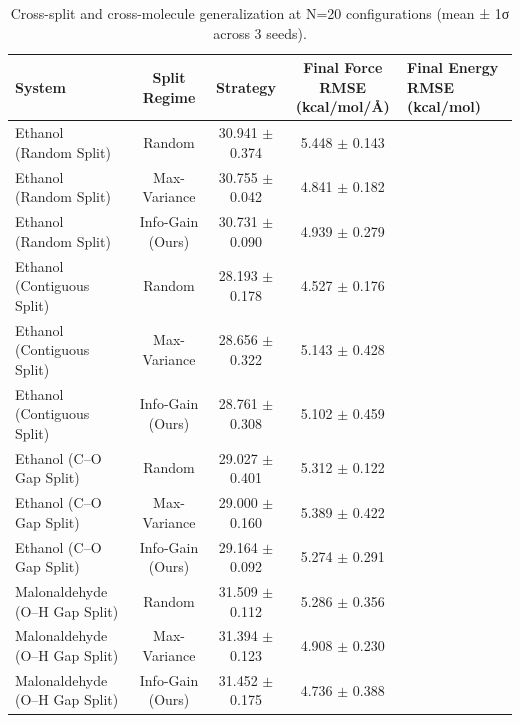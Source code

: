 \begin{table}[htbp]
\centering
\caption{Cross-split and cross-molecule generalization at N=20 configurations (mean ± 1σ across 3 seeds).}
\label{tab:multi_split_robustness}
\begin{tabular}{lccc}
\toprule
System & Split Regime & Strategy & Final Force RMSE (kcal/mol/Å) & Final Energy RMSE (kcal/mol) \\
\midrule
Ethanol (Random Split) & Random & 30.941 $\pm$ 0.374 & 5.448 $\pm$ 0.143 \\
Ethanol (Random Split) & Max-Variance & 30.755 $\pm$ 0.042 & 4.841 $\pm$ 0.182 \\
Ethanol (Random Split) & Info-Gain (Ours) & 30.731 $\pm$ 0.090 & 4.939 $\pm$ 0.279 \\
Ethanol (Contiguous Split) & Random & 28.193 $\pm$ 0.178 & 4.527 $\pm$ 0.176 \\
Ethanol (Contiguous Split) & Max-Variance & 28.656 $\pm$ 0.322 & 5.143 $\pm$ 0.428 \\
Ethanol (Contiguous Split) & Info-Gain (Ours) & 28.761 $\pm$ 0.308 & 5.102 $\pm$ 0.459 \\
Ethanol (C–O Gap Split) & Random & 29.027 $\pm$ 0.401 & 5.312 $\pm$ 0.122 \\
Ethanol (C–O Gap Split) & Max-Variance & 29.000 $\pm$ 0.160 & 5.389 $\pm$ 0.422 \\
Ethanol (C–O Gap Split) & Info-Gain (Ours) & 29.164 $\pm$ 0.092 & 5.274 $\pm$ 0.291 \\
Malonaldehyde (O–H Gap Split) & Random & 31.509 $\pm$ 0.112 & 5.286 $\pm$ 0.356 \\
Malonaldehyde (O–H Gap Split) & Max-Variance & 31.394 $\pm$ 0.123 & 4.908 $\pm$ 0.230 \\
Malonaldehyde (O–H Gap Split) & Info-Gain (Ours) & 31.452 $\pm$ 0.175 & 4.736 $\pm$ 0.388 \\
\bottomrule
\end{tabular}
\end{table}
